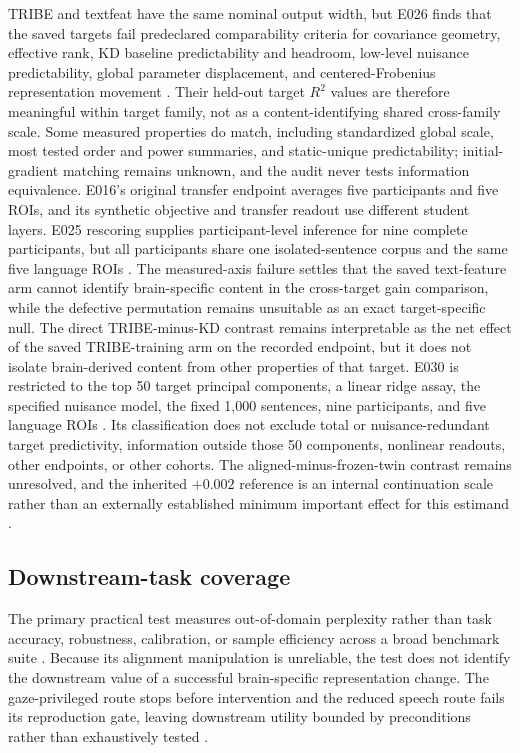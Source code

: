 TRIBE and textfeat have the same nominal output width, but E026 finds that the saved targets fail predeclared comparability criteria for covariance geometry, effective rank, KD baseline predictability and headroom, low-level nuisance predictability, global parameter displacement, and centered-Frobenius representation movement .
Their held-out target $R^2$ values are therefore meaningful within target family, not as a content-identifying shared cross-family scale.
Some measured properties do match, including standardized global scale, most tested order and power summaries, and static-unique predictability; initial-gradient matching remains unknown, and the audit never tests information equivalence.
E016's original transfer endpoint averages five participants and five ROIs, and its synthetic objective and transfer readout use different student layers.
E025 rescoring supplies participant-level inference for nine complete participants, but all participants share one isolated-sentence corpus and the same five language ROIs .
The measured-axis failure settles that the saved text-feature arm cannot identify brain-specific content in the cross-target gain comparison, while the defective permutation remains unsuitable as an exact target-specific null.
The direct TRIBE-minus-KD contrast remains interpretable as the net effect of the saved TRIBE-training arm on the recorded endpoint, but it does not isolate brain-derived content from other properties of that target.
E030 is restricted to the top 50 target principal components, a linear ridge assay, the specified nuisance model, the fixed 1,000 sentences, nine participants, and five language ROIs .
Its classification does not exclude total or nuisance-redundant target predictivity, information outside those 50 components, nonlinear readouts, other endpoints, or other cohorts.
The aligned-minus-frozen-twin contrast remains unresolved, and the inherited $+0.002$ reference is an internal continuation scale rather than an externally established minimum important effect for this estimand .

\subsection{Downstream-task coverage}

The primary practical test measures out-of-domain perplexity rather than task accuracy, robustness, calibration, or sample efficiency across a broad benchmark suite .
Because its alignment manipulation is unreliable, the test does not identify the downstream value of a successful brain-specific representation change.
The gaze-privileged route stops before intervention and the reduced speech route fails its reproduction gate, leaving downstream utility bounded by preconditions rather than exhaustively tested  .
